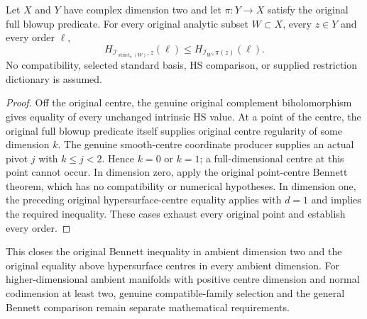 \begin{theorem}
\label{hir:actual-ambient-surface-blowup-bennett}
\leanok
Let $X$ and $Y$ have complex dimension two and let $\pi:Y\to X$
satisfy the original full blowup predicate. For every original analytic
subset $W\subset X$, every $z\in Y$ and every order $\ell$,
\[
 H_{\mathcal I_{\operatorname{strict}_{\pi}(W)},z}(\ell)
 \le H_{\mathcal I_W,\pi(z)}(\ell).
\]
No compatibility, selected standard basis, HS comparison, or supplied
restriction dictionary is assumed.
\end{theorem}
\begin{proof}
Off the original centre, the genuine original complement
biholomorphism gives equality of every unchanged intrinsic HS value.
At a point of the centre, the original full blowup predicate itself
supplies original centre regularity of some dimension $k$. The genuine
smooth-centre coordinate producer supplies an actual pivot $j$ with
$k\le j<2$. Hence $k=0$ or $k=1$; a full-dimensional centre at this
point cannot occur. In dimension zero, apply the original point-centre
Bennett theorem, which has no compatibility or numerical hypotheses.
In dimension one, the preceding original hypersurface-centre equality
applies with $d=1$ and implies the required inequality. These cases
exhaust every original point and establish every order.
\end{proof}

This closes the original Bennett inequality in ambient dimension two
and the original equality above hypersurface centres in every ambient
dimension. For higher-dimensional ambient manifolds with positive
centre dimension and normal codimension at least two, genuine
compatible-family selection and the general Bennett comparison remain
separate mathematical requirements.
